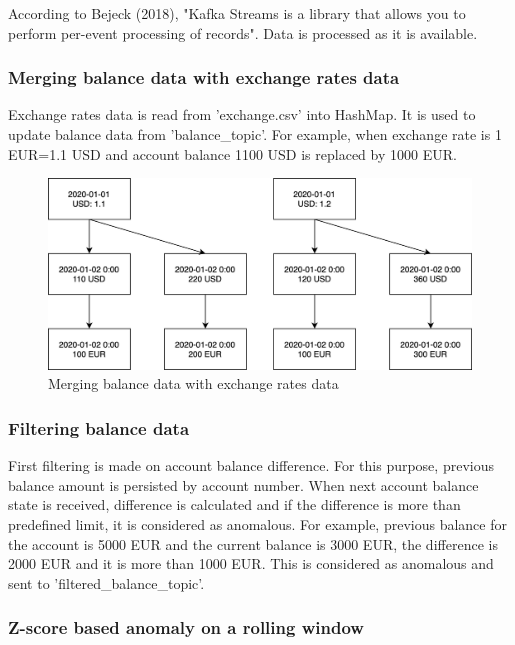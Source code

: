 \documentclass{article}
\begin{document}
According to Bejeck (2018), "Kafka Streams is a library that allows you to perform per-event processing of records". Data is processed as it is available.

\subsubsection{Merging balance data with exchange rates data}

Exchange rates data is read from 'exchange.csv' into HashMap. It is used to update balance data from 'balance\_topic'. For example, when exchange rate is 1 EUR=1.1 USD and account balance 1100 USD is replaced by 1000 EUR.

\begin{figure}[h!]
\centering
\includegraphics[width=\textwidth]{rates.PNG}
\caption{Merging balance data with exchange rates data}
\label{fig:ExchangeRateMerge}
\end{figure}

\subsubsection{Filtering balance data}

First filtering is made on account balance difference. For this purpose, previous balance amount is persisted by account number. When next account balance state is received, difference is calculated and if the difference is more than predefined limit, it is considered as anomalous. For example, previous balance for the account is 5000 EUR and the current balance is 3000 EUR, the difference is 2000 EUR and it is more than 1000 EUR. This is considered as anomalous and sent to 'filtered\_balance\_topic'.

\subsubsection{Z-score based anomaly on a rolling window}
\end{document}
